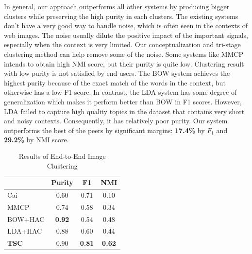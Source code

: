 In general, our approach outperforms all other systems by
producing bigger clusters while preserving
the high purity in each clusters. The existing systems don't have
a very good way to handle noise, which is often seen in the contexts of
web images. The noise usually dilute the positive impact of the important
signals, especially when the context is very limited. Our conceptualization
and tri-stage clustering method can help remove some of the noise.
Some systems like MMCP intends to obtain high NMI score,
but their purity is quite low. Clustering result with low purity is
not satisfied by end users.
The BOW system achieves the highest purity because of the exact match of the
words in the context, but otherwise has a low F1 score.
In contrast, the LDA system has some degree of generalization which
makes it perform better than BOW in F1 scores.
However, LDA failed to capture high quality topics in the dataset that
contains very short and noisy contexts. Consequently, it has relatively
poor purity.
Our system outperforms the best of the peers
by significant margins: {\bf 17.4\%} by $F_1$ and {\bf 29.2\%} by NMI score.


\begin{table}[th]
\centering
\caption{Results of End-to-End Image Clustering}
\small
\begin{tabular}{|l|c|c|c|}
\hline
           &  Purity &    F1 &   NMI  \\
\hline
  Cai &      0.60  &      0.71  &      0.10   \\
\hline
 MMCP &      0.74  &      0.58  &      0.34   \\
\hline
 BOW+HAC &     {\bf 0.92}  &      0.54  &      0.48   \\
\hline
 LDA+HAC & 0.88 & 0.60 & 0.44\\
\hline
{\bf TSC} &      0.90  &    {\bf 0.81}  &    {\bf 0.62}   \\
\hline
\end{tabular}
\label{tab:end2end}
\end{table}

